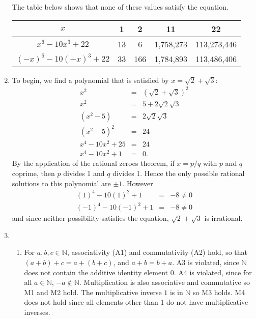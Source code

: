 \documentclass[12pt]{article}
\newcommand{\N}{\mathbb{N}}
\begin{document}
\begin{enumerate}
    The table below shows that none of these values satisfy the equation.
    \begin{center}
      \begin{tabular}{c|c|c|c|c}
	$x$ & 1 & 2 & 11 & 22 \\
	\hline
	$x^6-10x^3+22$ & 13 & 6 & 1,758,273 & 113,273,446 \\
	$(-x)^6-10(-x)^3+22$ & 33 & 166 & 1,784,893 & 113,486,406 \\
      \end{tabular}
    \end{center}
  \item To begin, we find a polynomial that is satisfied by $x=\sqrt{2} +
    \sqrt{3}$:
    \begin{eqnarray*}
      x^2 &=& (\sqrt{2}+\sqrt{3})^2 \\
      x^2 &=& 5+ 2\sqrt{2}\sqrt{3} \\
      (x^2-5) &=& 2\sqrt{2}\sqrt{3} \\
      (x^2-5)^2 &=& 24 \\
      x^4-10x^2 + 25 &=& 24 \\
      x^4-10x^2 + 1 &=& 0.
    \end{eqnarray*}
    By the application of the rational zeroes theorem, if $x=p/q$ with $p$ and
    $q$ coprime, then $p$ divides 1 and $q$ divides 1. Hence the only possible
    rational solutions to this polynomial are $\pm 1$. However
    \begin{eqnarray*}
      (1)^4 - 10(1)^2 + 1 &=& -8 \ne 0 \\
      (-1)^4 - 10 (-1)^2 +1 &=& -8 \ne 0
    \end{eqnarray*}
    and since neither possibility satisfies the equation, $\sqrt{2} + \sqrt{3}$
    is irrational.
  \item
    \begin{enumerate}
      \item For $a,b,c\in \N$, associativity (A1) and commutativity (A2) hold,
	so that $(a+b)+c = a+(b+c)$, and $a+b=b+a$. A3 is violated, since
	$\N$ does not contain the additive identity element $0$. A4 is violated,
	since for all $a\in \N$, $-a\notin \N$. Multiplication is also associative
	and commutative so M1 and M2 hold. The multiplicative inverse $1$ is in $\N$
	so M3 holds. M4 does not hold since all elements other than 1 do not
	have multiplicative inverses.


\end{enumerate}
\end{enumerate}
\end{document}
